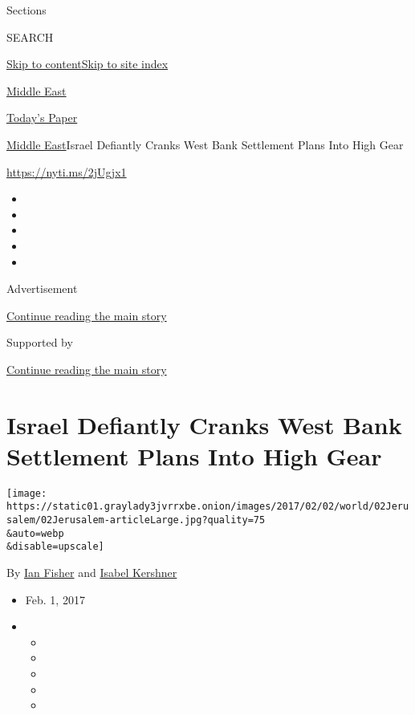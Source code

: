 Sections

SEARCH

\protect\hyperlink{site-content}{Skip to
content}\protect\hyperlink{site-index}{Skip to site index}

\href{https://www.nytimes3xbfgragh.onion/section/world/middleeast}{Middle
East}

\href{https://myaccount.nytimes3xbfgragh.onion/auth/login?response_type=cookie\&client_id=vi}{}

\href{https://www.nytimes3xbfgragh.onion/section/todayspaper}{Today's
Paper}

\href{/section/world/middleeast}{Middle East}\textbar{}Israel Defiantly
Cranks West Bank Settlement Plans Into High Gear

\url{https://nyti.ms/2jUgjx1}

\begin{itemize}
\item
\item
\item
\item
\item
\end{itemize}

Advertisement

\protect\hyperlink{after-top}{Continue reading the main story}

Supported by

\protect\hyperlink{after-sponsor}{Continue reading the main story}

\hypertarget{israel-defiantly-cranks-west-bank-settlement-plans-into-high-gear}{%
\section{Israel Defiantly Cranks West Bank Settlement Plans Into High
Gear}\label{israel-defiantly-cranks-west-bank-settlement-plans-into-high-gear}}

\texttt{[image: https://static01.graylady3jvrrxbe.onion/images/2017/02/02/world/02Jerusalem/02Jerusalem-articleLarge.jpg?quality=75\\\&auto=webp\\\&disable=upscale]}

By \href{http://www.nytimes3xbfgragh.onion/by/ian-fisher}{Ian Fisher}
and \href{https://www.nytimes3xbfgragh.onion/by/isabel-kershner}{Isabel
Kershner}

\begin{itemize}
\item
  Feb. 1, 2017
\item
  \begin{itemize}
  \item
  \item
  \item
  \item
  \item
  \end{itemize}
\end{itemize}

